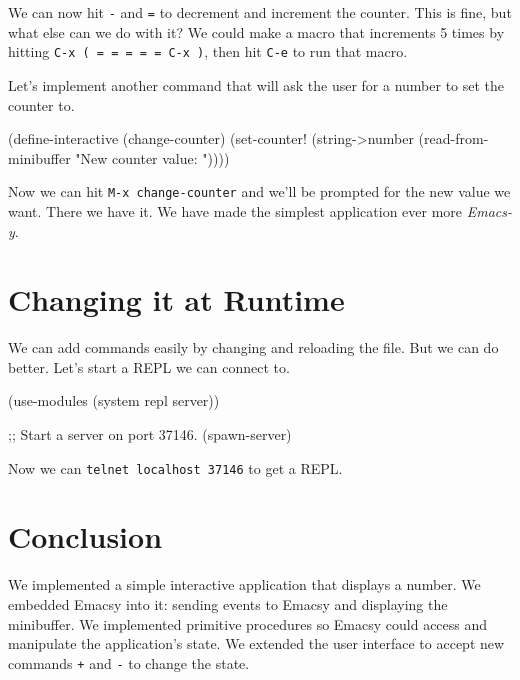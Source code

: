 We can now hit \verb|-| and \verb|=| to decrement and increment the
{\Tt{}counter\nwendquote}. This is fine, but what else can we do with it?  We could
make a macro that increments 5 times by hitting
\verb|C-x ( = = = = = C-x )|, then hit \verb|C-e| to run that macro.

Let's implement another command that will ask the user for a number to
set the counter to.

\nwenddocs{}\plusendmoddef\nwstartdeflinemarkup{}\nwenddeflinemarkup
(define-interactive (change-counter) 
 (set-counter! 
   (string->number 
     (read-from-minibuffer 
       "New counter value: "))))
\nwendcode{}\nwdocspar

Now we can hit \verb|M-x change-counter| and we'll be prompted for the
new value we want.  There we have it.  We have made the simplest
application ever more \emph{Emacs-y}.

\section{Changing it at Runtime}

We can add commands easily by changing and reloading the file.  But
we can do better.  Let's start a REPL we can connect to.

\nwenddocs{}\plusendmoddef\nwstartdeflinemarkup{}\nwenddeflinemarkup
(use-modules (system repl server))

;; Start a server on port 37146.
(spawn-server)
\nwendcode{}\nwdocspar

Now we can \verb|telnet localhost 37146| to get a REPL.  

\section{Conclusion}
We implemented a simple interactive application that displays a
number.  We embedded Emacsy into it: sending events to Emacsy and
displaying the minibuffer.  We implemented primitive procedures so
Emacsy could access and manipulate the application's state.  We
extended the user interface to accept new commands \verb|+| and
\verb|-| to change the state.

